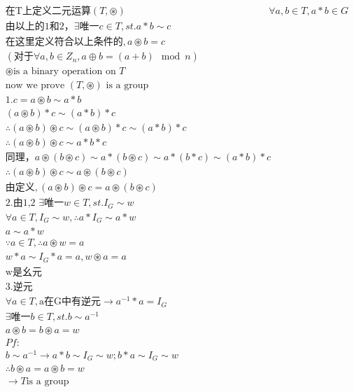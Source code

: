 \documentclass[12pt, a4paper]{article}  %
\begin{document}
\begin{align}
    &\text{在T上定义二元运算}(T,\circledast )
    &\forall a,b\in T,a*b\in G\\
    &\text{由以上的1和2，}\exists \text{唯一}c\in T,st. a*b\sim c\\
    &\text{在这里定义符合以上条件的},a\circledast b=c\\
    &(\text{对于}\forall a,b\in Z_n,a\oplus b=(a+b)\mod n)\\
    &\circledast \text {is a binary operation on }T\\
    &\text{now we prove \((T,\circledast) \) is a group}\\
    &1. c=a\circledast b\sim a*b\\
    & (a\circledast b) * c\sim (a*b)*c\\
    & \therefore (a\circledast b)\circledast c\sim (a\circledast b)*c\sim (a*b)*c\\
    & \therefore (a\circledast b)\circledast c\sim a*b*c\\
    &\text{同理，}a\circledast (b\circledast c)\sim a*(b\circledast c)\sim a*(b*c)\sim (a*b)*c\\
    &\therefore (a\circledast b)\circledast c\sim a\circledast(b\circledast c)\\
    &\text{由定义},(a\circledast b)\circledast c=a\circledast (b\circledast c)\\
    &2. \text{由1,2 }\exists\text{唯一} w\in T,st. I_G\sim w\\
    &\forall a\in T,I_G\sim w,\therefore a*I_G\sim a*w\\
    &a\sim a*w\\
    &\because a\in T,\therefore a\circledast w=a\\
    &w*a\sim I_G*a=a,w \circledast a=a\\
    &\text{w是幺元}\\
    &3.\text{逆元}\\
    & \forall a\in T,\text{a在G中有逆元}\rightarrow a^{-1}*a=I_G\\
    &\exists \text{唯一} b\in T,st. b\sim a^{-1}\\
    &a\circledast b=b\circledast a=w\\
    &Pf:\\
    &b\sim a^{-1}\rightarrow a*b\sim I_G\sim w;b*a\sim I_G\sim w\\
    &\therefore b\circledast a=a\circledast b=w
    &\\
    &\rightarrow T\text{is a group}
\end{align}
\end{document}
